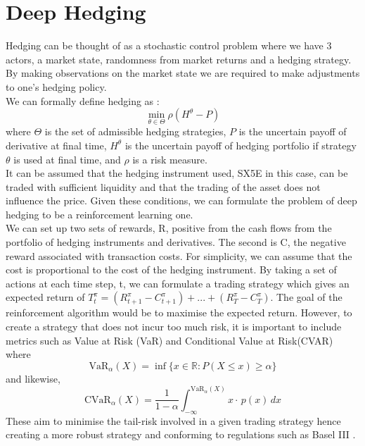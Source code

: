 \documentclass[12pt]{article}
\numberwithin{equation}{section}
\begin{document}
\clearpage
\section{Deep Hedging}

Hedging can be thought of as a stochastic control problem where we have 3 actors, 
a market state, randomness from market returns and a hedging strategy. By making 
observations on the market state we are required to make adjustments to one's
hedging policy. 
\\
We can formally define hedging as :
$$\min_{\theta \in \Theta} \rho (H^\theta - P)$$
where $\Theta$ is the set of admissible hedging strategies, $P$ is the uncertain 
payoff of derivative at final time, $H^\theta$ is the uncertain payoff of hedging 
portfolio if strategy $\theta$ is used at final time, and $\rho$ is a risk measure.
\\
It can be assumed that the hedging instrument used, SX5E in this case, can be 
traded with sufficient liquidity and that the trading of the asset does not 
influence the price. Given these conditions, we can formulate the problem of deep 
hedging to be a reinforcement learning one. 
\\
We can set up two sets of rewards, R, positive from the cash flows from the 
portfolio of hedging instruments and derivatives. The second is C, the negative 
reward associated with transaction costs. For simplicity, we can assume that the 
cost is proportional to the cost of the hedging instrument. By taking a set of 
actions at each time step, t, we can formulate a trading strategy which gives an 
expected return of
$T^\pi_t = (R^\pi_{t+1} - C^\pi_{t+1} )+ ... +(R^\pi_T - C^\pi_T)$.
The goal of the reinforcement algorithm would be to maximise the expected return. 
However, to create a strategy that does not incur too much risk, it is important 
to include metrics such as Value at Risk (VaR) and Conditional Value at Risk(CVAR)
where
\begin{equation}
\text{VaR}_{\alpha}(X) = \inf \{x \in \mathbb{R} : P(X \leq x) \geq \alpha \}
\end{equation}
and likewise,
\begin{equation}
\text{CVaR}_{\alpha}(X) = \frac{1}{1 - \alpha} \int_{-\infty}^{\text{VaR}_{\alpha}(X)} x \cdot\, p(x) \, dx
\end{equation}
These aim to minimise the tail-risk involved in a given trading strategy hence 
creating a more robust strategy and conforming to regulations such as Basel III
\cite{saissihassani_2021_the}.
\end{document}
